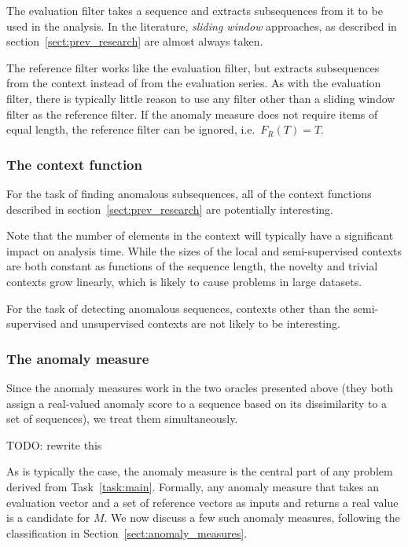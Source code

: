The evaluation filter takes a sequence and extracts subsequences from it to be used in the analysis. In the literature, \emph{sliding window} approaches, as described in section~\ref{sect:prev_research} are almost always taken.

The reference filter works like the evaluation filter, but extracts subsequences from the context instead of from the evaluation series. As with the evaluation filter, there is typically little reason to use any filter other than a sliding window filter as the reference filter. If the anomaly measure does not require items of equal length, the reference filter can be ignored, i.e.\ $F_R(T) = T$.

\subsubsection{The context function}

For the task of finding anomalous subsequences, all of the context functions described in section~\ref{sect:prev_research} are potentially interesting.

Note that the number of elements in the context will typically have a significant impact on analysis time. While the sizes of the local and semi-supervised contexts are both constant as functions of the sequence length, the novelty and trivial contexts grow linearly, which is likely to cause problems in large datasets.

For the task of detecting anomalous sequences, contexts other than the semi-supervised and unsupervised contexts are not likely to be interesting.

\subsubsection{The anomaly measure}
Since the anomaly measures work in the two oracles presented above (they both assign a real-valued anomaly score to a sequence based on its dissimilarity to a set of sequences), we treat them simultaneously.

TODO: rewrite this

As is typically the case, the anomaly measure is the central part of any problem derived from Task~\ref{task:main}. Formally, any anomaly measure that takes an evaluation vector and a set of reference vectors as inputs and returns a real value is a candidate for $M$. We now discuss a few such anomaly measures, following the classification in Section~\ref{sect:anomaly_measures}.

